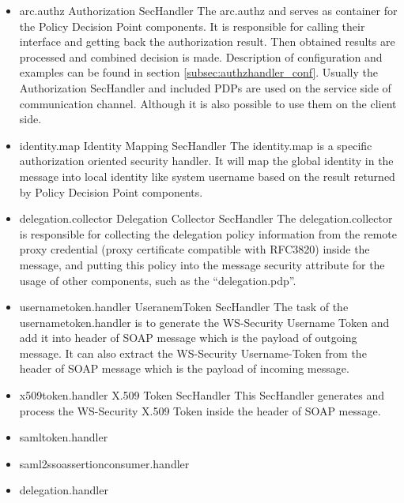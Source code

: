 \documentclass{article}                            %
\begin{document}
\begin{itemize}
    \item arc.authz Authorization SecHandler
The arc.authz and serves as container for the Policy Decision Point components. It is responsible for calling their interface and getting back the authorization result. Then obtained results are processed and combined decision is made. Description of configuration and examples can be found in section \ref{subsec:authzhandler_conf}. Usually the Authorization SecHandler and included PDPs are used on the service side of communication channel. Although it is also possible to use them on the client side.

    \item identity.map Identity Mapping SecHandler
The identity.map is a specific authorization oriented security handler. It will map the global identity in the message into local identity like system username based on the result returned by Policy Decision Point components.

    \item delegation.collector Delegation Collector SecHandler
The delegation.collector is responsible for collecting the delegation policy information from the remote proxy credential (proxy certificate compatible with RFC3820) inside the message, and putting this policy into the message security attribute for the usage of other components, such as the ``delegation.pdp''.

    \item usernametoken.handler UseranemToken SecHandler
The task of the  usernametoken.handler is to generate the WS-Security\cite{ws-security} Username Token and add it into header of SOAP message which is the payload of outgoing message. It can also extract the WS-Security Username-Token from the header of SOAP message which is the payload of incoming message.

    \item x509token.handler X.509 Token SecHandler
This SecHandler generates and process the WS-Security\cite{ws-security} X.509 Token inside the header of SOAP message.

    \item samltoken.handler 

    \item saml2ssoassertionconsumer.handler 

    \item delegation.handler 

\end{itemize}
\end{document}
